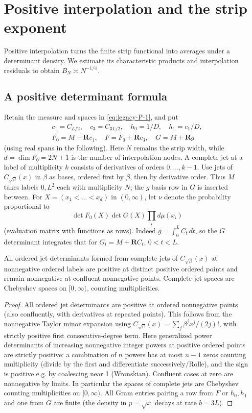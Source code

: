 \section{Positive interpolation and the strip exponent}\label{c6:strip-asymptotics}

Positive interpolation turns the finite strip functional into averages under a determinant density. We estimate its characteristic products and interpolation residuals to obtain $B_N\asymp N^{-1/4}$. 

\subsection{A positive determinant formula}
Retain the measure and spaces in \eqref{eq:legacy-P-1}, and put
\[
 \begin{gathered}
 c_1=C_{L/2},\quad c_3=C_{3L/2},\quad h_0=1/D,\quad h_1=c_1/D,\\
 F_0=M+\mathbf R c_1,\quad F=F_0+\mathbf R c_3,\quad G=M+\mathbf R g
 \end{gathered}
\]
(using real spans in the following). Here $N$ remains the strip width, while $d=\dim F_0=2N+1$ is the number of interpolation nodes. A complete jet at a label of multiplicity $k$ consists of derivatives of orders $0,\ldots,k-1$. Use jets of $C_{\sqrt\beta}(x)$ in $\beta$ as bases, ordered first by $\beta$, then by derivative order. Thus $M$ takes labels $0,L^2$ each with multiplicity $N$; the $g$ basis row in $G$ is inserted between. For $X=(x_1<\dots<x_d)$ in $(0,\infty)$, let $\nu$ denote the probability proportional to
\[
 \det F_0(X)\det G(X)\prod_i d\mu(x_i)
\]
(evaluation matrix with functions as rows). Indeed $g=\int_0^L C_t\,dt$, so the $G$ determinant integrates that for $G_t=M+\mathbf R C_t$, $0<t<L$. \begin{lemma}\label{lemma:jet-interpolation}
All ordered jet determinants formed from complete jets of $C_{\sqrt\beta}(x)$ at nonnegative ordered labels are positive at distinct positive ordered points and remain nonnegative at confluent nonnegative points. Complete jet spaces are Chebyshev spaces on $[0,\infty)$, counting multiplicities.\end{lemma}
\begin{proof}
All ordered jet determinants are positive at ordered nonnegative points (also confluently, with derivatives at repeated points). This follows from the nonnegative Taylor minor expansion using $C_{\sqrt\beta}(x)=\sum_j \beta^j x^j/(2j)!$, with strictly positive first consecutive-degree term. Here generalized power determinants of increasing nonnegative integer powers at positive ordered points are strictly positive: a combination of $n$ powers has at most $n-1$ zeros counting multiplicity (divide by the first and differentiate successively/Rolle), and the sign is positive e.g. by coalescing near 1 (Wronskian). Confluent cases at zero are nonnegative by limits. In particular the spaces of complete jets are Chebyshev counting multiplicities on $[0,\infty)$. All Gram entries pairing a row from $F$ or $h_0,h_1$ and one from $G$ are finite (the density in $p=\sqrt{x}$ decays at rate $b=3L$).
\end{proof}

